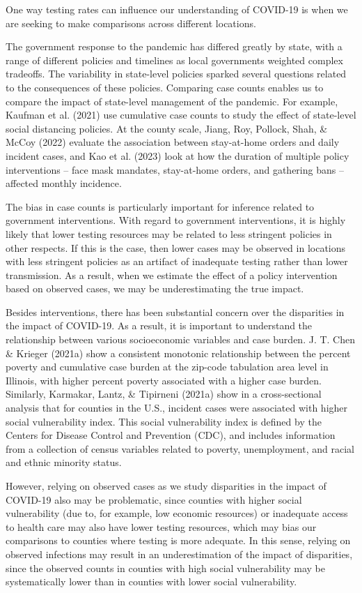 \documentclass[12pt,twoside]{smiththesis}
\begin{document}
One way testing rates can influence our understanding of COVID-19 is when we are seeking to make comparisons across different locations.

The government response to the pandemic has differed greatly by state, with a range of different policies and timelines as local governments weighted complex tradeoffs. The variability in state-level policies sparked several questions related to the consequences of these policies. Comparing case counts enables us to compare the impact of state-level management of the pandemic. For example, Kaufman et al. (2021) use cumulative case counts to study the effect of state-level social distancing policies. At the county scale, Jiang, Roy, Pollock, Shah, \& McCoy (2022) evaluate the association between stay-at-home orders and daily incident cases, and Kao et al. (2023) look at how the duration of multiple policy interventions -- face mask mandates, stay-at-home orders, and gathering bans -- affected monthly incidence.

The bias in case counts is particularly important for inference related to government interventions. With regard to government interventions, it is highly likely that lower testing resources may be related to less stringent policies in other respects. If this is the case, then lower cases may be observed in locations with less stringent policies as an artifact of inadequate testing rather than lower transmission. As a result, when we estimate the effect of a policy intervention based on observed cases, we may be underestimating the true impact.

Besides interventions, there has been substantial concern over the disparities in the impact of COVID-19. As a result, it is important to understand the relationship between various socioeconomic variables and case burden. J. T. Chen \& Krieger (2021a) show a consistent monotonic relationship between the percent poverty and cumulative case burden at the zip-code tabulation area level in Illinois, with higher percent poverty associated with a higher case burden. Similarly, Karmakar, Lantz, \& Tipirneni (2021a) show in a cross-sectional analysis that for counties in the U.S., incident cases were associated with higher social vulnerability index. This social vulnerability index is defined by the Centers for Disease Control and Prevention (CDC), and includes information from a collection of census variables related to poverty, unemployment, and racial and ethnic minority status.

However, relying on observed cases as we study disparities in the impact of COVID-19 also may be problematic, since counties with higher social vulnerability (due to, for example, low economic resources) or inadequate access to health care may also have lower testing resources, which may bias our comparisons to counties where testing is more adequate. In this sense, relying on observed infections may result in an underestimation of the impact of disparities, since the observed counts in counties with high social vulnerability may be systematically lower than in counties with lower social vulnerability.
\end{document}
